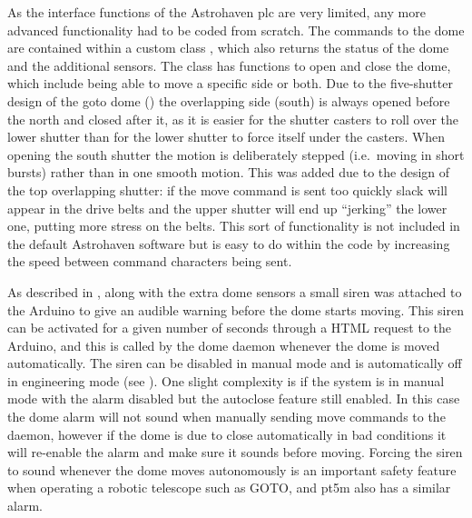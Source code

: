 \begin{colsection}
\begin{colsection}
As the interface functions of the Astrohaven \gls{plc} are very limited, any more advanced functionality had to be coded from scratch. The commands to the dome are contained within a custom  class , which also returns the status of the dome and the additional sensors. The class has functions to open and close the dome, which include being able to move a specific side or both. Due to the five-shutter design of the \gls{goto} dome () the overlapping side (south) is always opened before the north and closed after it, as it is easier for the shutter casters to roll over the lower shutter than for the lower shutter to force itself under the casters. When opening the south shutter the motion is deliberately stepped (i.e.\ moving in short bursts) rather than in one smooth motion. This was added due to the design of the top overlapping shutter: if the move command is sent too quickly slack will appear in the drive belts and the upper shutter will end up ``jerking'' the lower one, putting more stress on the belts. This sort of functionality is not included in the default Astrohaven software but is easy to do within the  code by increasing the speed between command characters being sent.

As described in , along with the extra dome sensors a small siren was attached to the Arduino to give an audible warning before the dome starts moving. This siren can be activated for a given number of seconds through a HTML request to the Arduino, and this is called by the dome daemon whenever the dome is moved automatically. The siren can be disabled in manual mode and is automatically off in engineering mode (see ). One slight complexity is if the system is in manual mode with the alarm disabled but the autoclose feature still enabled. In this case the dome alarm will not sound when manually sending move commands to the daemon, however if the dome is due to close automatically in bad conditions it will re-enable the alarm and make sure it sounds before moving. Forcing the siren to sound whenever the dome moves autonomously is an important safety feature when operating a robotic telescope such as GOTO, and pt5m also has a similar alarm.


\end{colsection}
\end{colsection}
